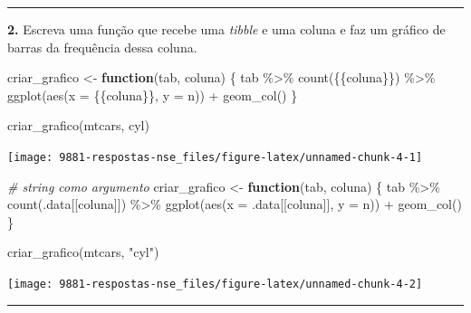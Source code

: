 \documentclass[
]{book}
\newenvironment{Shaded}{\begin{snugshade}}{\end{snugshade}}
\newcommand{\AttributeTok}[1]{\textcolor[rgb]{0.77,0.63,0.00}{#1}}
\newcommand{\CommentTok}[1]{\textcolor[rgb]{0.56,0.35,0.01}{\textit{#1}}}
\newcommand{\ControlFlowTok}[1]{\textcolor[rgb]{0.13,0.29,0.53}{\textbf{#1}}}
\newcommand{\FunctionTok}[1]{\textcolor[rgb]{0.00,0.00,0.00}{#1}}
\newcommand{\NormalTok}[1]{#1}
\newcommand{\OtherTok}[1]{\textcolor[rgb]{0.56,0.35,0.01}{#1}}
\newcommand{\SpecialCharTok}[1]{\textcolor[rgb]{0.00,0.00,0.00}{#1}}
\newcommand{\StringTok}[1]{\textcolor[rgb]{0.31,0.60,0.02}{#1}}
\begin{document}
\begin{center}\rule{0.5\linewidth}{0.5pt}\end{center}

\textbf{2.} Escreva uma função que recebe uma \emph{tibble} e uma coluna e faz um gráfico de barras da frequência dessa coluna.

\begin{Shaded}
\begin{Highlighting}[]
\NormalTok{criar\_grafico }\OtherTok{\textless{}{-}} \ControlFlowTok{function}\NormalTok{(tab, coluna) \{}
\NormalTok{  tab }\SpecialCharTok{\%\textgreater{}\%}
    \FunctionTok{count}\NormalTok{(\{\{coluna\}\}) }\SpecialCharTok{\%\textgreater{}\%}
    \FunctionTok{ggplot}\NormalTok{(}\FunctionTok{aes}\NormalTok{(}\AttributeTok{x =}\NormalTok{ \{\{coluna\}\}, }\AttributeTok{y =}\NormalTok{ n)) }\SpecialCharTok{+}
    \FunctionTok{geom\_col}\NormalTok{()}
\NormalTok{\}}

\FunctionTok{criar\_grafico}\NormalTok{(mtcars, cyl)}
\end{Highlighting}
\end{Shaded}

\begin{center}\texttt{[image: 9881-respostas-nse\_files/figure-latex/unnamed-chunk-4-1]} \end{center}

\begin{Shaded}
\begin{Highlighting}[]

\CommentTok{\# string como argumento}
\NormalTok{criar\_grafico }\OtherTok{\textless{}{-}} \ControlFlowTok{function}\NormalTok{(tab, coluna) \{}
\NormalTok{  tab }\SpecialCharTok{\%\textgreater{}\%}
    \FunctionTok{count}\NormalTok{(.data[[coluna]]) }\SpecialCharTok{\%\textgreater{}\%}
    \FunctionTok{ggplot}\NormalTok{(}\FunctionTok{aes}\NormalTok{(}\AttributeTok{x =}\NormalTok{ .data[[coluna]], }\AttributeTok{y =}\NormalTok{ n)) }\SpecialCharTok{+}
    \FunctionTok{geom\_col}\NormalTok{()}
\NormalTok{\}}

\FunctionTok{criar\_grafico}\NormalTok{(mtcars, }\StringTok{"cyl"}\NormalTok{)}
\end{Highlighting}
\end{Shaded}

\begin{center}\texttt{[image: 9881-respostas-nse\_files/figure-latex/unnamed-chunk-4-2]} \end{center}

\begin{center}\rule{0.5\linewidth}{0.5pt}\end{center}
\end{document}
